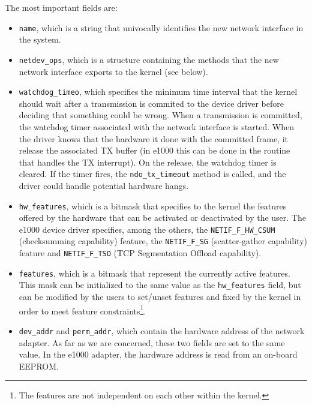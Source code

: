The most important fields are:
\begin{itemize}
    \item \texttt{name}, which is a string that univocally identifies the new network interface in the system.
    
    \item \texttt{netdev\_ops}, which is a structure containing the methods that the new network interface exports to the kernel 
	  (see below).
	  
    \item \texttt{watchdog\_timeo}, which specifies the minimum time interval that the kernel should wait after a transmission is commited
	  to the device driver before deciding that something could be wrong. When a transmission is committed, the watchdog timer 
	  associated with the network interface is started. When the driver knows that the hardware it done with the committed frame,
	  it release the associated TX buffer (in e1000 this can be done in the routine that handles the TX interrupt). On the release,
	  the watchdog timer is cleared. If the timer fires, the \texttt{ndo\_tx\_timeout} method is called, and the driver could
	  handle potential hardware hangs.
	  
    \item \texttt{hw\_features}, which is a bitmask that specifies to the kernel the features offered by the hardware that can be activated
	  or deactivated by the user. The e1000 device driver specifies, among the others, the \texttt{NETIF\_F\_HW\_CSUM} (checksumming
	  capability) feature, the \texttt{NETIF\_F\_SG} (scatter-gather capability) feature and \texttt{NETIF\_F\_TSO} (TCP Segmentation
	  Offload capability).
	  
    \item \texttt{features}, which is a bitmask that represent the currently active features. This mask can be initialized to the same
	  value as the \texttt{hw\_features} field, but can be modified by the users to set/unset features and fixed by the kernel in
	  order to meet feature constraints\footnote{The features are not independent on each other within the kernel.}.
	  
    \item \texttt{dev\_addr} and \texttt{perm\_addr}, which contain the hardware address of the network adapter. As far as we are
	  concerned, these two fields are set to the same value. In the e1000 adapter, the hardware address is read from an on-board
	  EEPROM.
\end{itemize}


